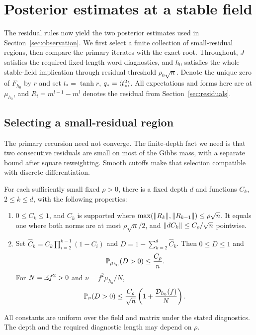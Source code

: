\section{Posterior estimates at a stable field}\label{sec:consequences}

The residual rules now yield the two posterior estimates used in
Section~\ref{sec:observation}. We first select a finite collection of
small-residual regions, then compare the primary iterates with the exact
root. Throughout, $J$ satisfies the required fixed-length word diagnostics,
and $h_0$ satisfies the whole stable-field implication through residual
threshold $\rho_0\sqrt n$. Denote the unique zero of $F_{h_0}$ by $r$ and
set $t_*=\tanh r$, $q_*=\langle t_*^2\rangle$. All expectations and forms here are
at $\mu_{h_0}$, and $R_l=m^{l-1}-m^l$ denotes the residual from
Section~\ref{sec:residuals}.

\subsection{Selecting a small-residual region}
The primary recursion need not converge. The finite-depth fact we need is
that two consecutive residuals are small on most of the Gibbs mass, with
a separate bound after square reweighting. Smooth cutoffs make that selection
compatible with discrete differentiation.
\begin{lemma}\label{lem:residual-selection}
For each sufficiently small fixed $\rho>0$, there is a fixed depth $d$ and
functions $C_k$, $2\le k\le d$, with the following properties:
\begin{enumerate}
\item $0\le C_k\le1$, and $C_k$ is supported where
$\max(\lVert R_k\rVert,\lVert R_{k-1}\rVert)\le\rho\sqrt n$. It equals one where both
norms are at most $\rho\sqrt n/2$, and $\lVert dC_k\rVert\le C_\rho/\sqrt n$
pointwise.
\item Set $\widehat C_k=C_k\prod_{i=2}^{k-1}(1-C_i)$ and
$D=1-\sum_{k=2}^d\widehat C_k$. Then $0\le D\le1$ and
\[
 \mathbb P_{\mu_{h_0}}(D>0)\le\frac{C_\rho}{n}.
\]
For $N=\mathbb E f^2>0$ and $\nu=f^2\mu_{h_0}/N$,
\[
 \mathbb P_\nu(D>0)\le\frac{C_\rho}{\sqrt n}
                   \left(1+\frac{\mathcal D_{h_0}(f)}{N}\right).
\]
\end{enumerate}
All constants are uniform over the field and matrix under the stated
diagnostics. The depth and the required diagnostic length may depend on
$\rho$.
\end{lemma}

